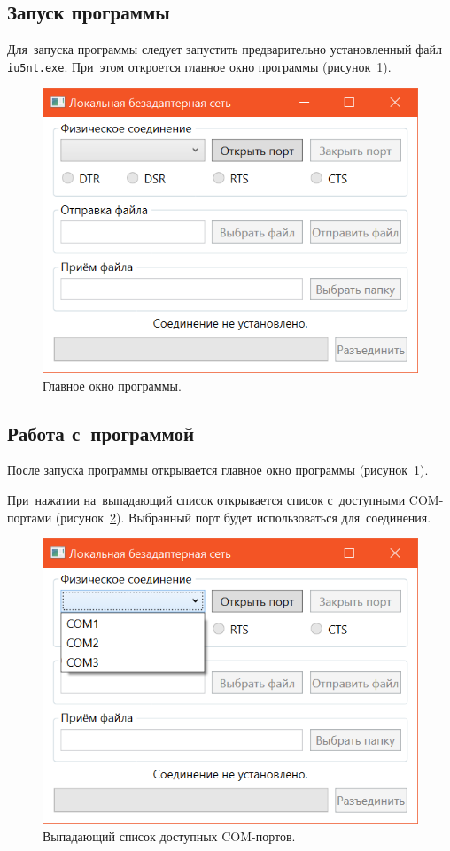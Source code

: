 \documentclass[a4paper,12pt]{article}
\begin{document}
\subsection{Запуск программы}
Для~запуска программы следует запустить предварительно установленный файл \texttt{iu5nt.exe}. При~этом откроется главное окно программы (рисунок~\ref{window}).
\begin{figure}
\centering
\includegraphics{window.png}
\caption{Главное окно программы.}\label{window}
\end{figure}

\subsection{Работа с~программой}
После запуска программы открывается главное окно программы (рисунок~\ref{window}).

При~нажатии на~выпадающий список открывается список с~доступными COM-портами (рисунок~\ref{list}). Выбранный порт будет использоваться для~соединения.
\begin{figure}
\centering
\includegraphics{list.png}
\caption{Выпадающий список доступных COM-портов.}\label{list}
\end{figure}
\end{document}
